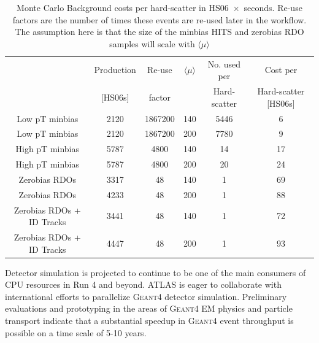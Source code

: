 \begin{table}[htb!]
  \caption{Monte Carlo Background costs per hard-scatter in HS06~$\times$~seconds. Re-use factors are the number of times these events are re-used later in the workflow. The assumption here is that the size of the minbias HITS and zerobias RDO samples will scale with $\langle\mu\rangle$ }
  \label{tab:SimCPU}
  \centering
  \begin{tabular}{|c||c|c|c|c|c|} \hline
             &  Production & Re-use & $\langle\mu\rangle$ & No. used per & Cost per \\ 
             &  [HS06s] & factor & & Hard-scatter & Hard-scatter [HS06s]\\ \hline
    Low pT minbias & 2120 & 1867200 & 140 & 5446 & 6\\
    Low pT minbias & 2120 & 1867200 & 200 & 7780 & 9\\
    High pT minbias & 5787 & 4800 & 140 & 14 &  17 \\
    High pT minbias & 5787 & 4800 & 200 & 20 &  24 \\
    Zerobias RDOs & 3317 & 48 & 140 & 1 & 69 \\
    Zerobias RDOs & 4233 & 48 & 200 & 1 & 88 \\
    Zerobias RDOs + ID Tracks & 3441 & 48 & 140 & 1 & 72 \\
    Zerobias RDOs + ID Tracks & 4447 & 48 & 200 & 1 & 93 \\ \hline
    \end{tabular}
  

\end{table}
Detector simulation is projected to continue to be one of the main consumers of CPU resources in Run 4 and beyond. ATLAS is eager to collaborate with international efforts to parallelize G\textsc{eant}4 detector simulation. Preliminary evaluations and prototyping in the areas of G\textsc{eant}4 EM physics and particle transport indicate that a substantial speedup in G\textsc{eant}4 event throughput is possible on a time scale of 5-10 years.

